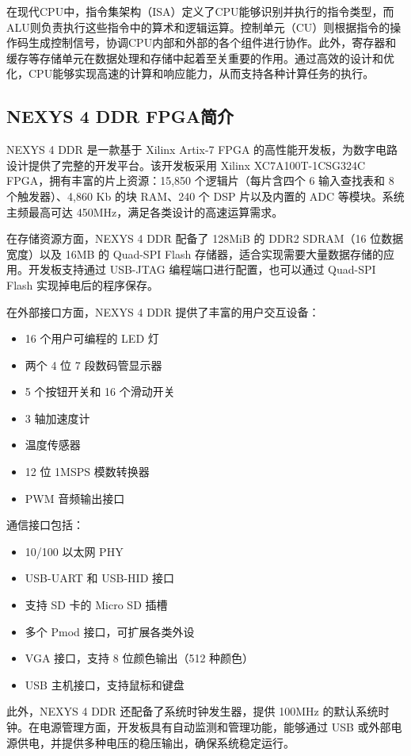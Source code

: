 \documentclass[lang=cn,a4paper,newtx]{elegantpaper}
\begin{document}
在现代CPU中，指令集架构（ISA）定义了CPU能够识别并执行的指令类型，而ALU则负责执行这些指令中的算术和逻辑运算。控制单元（CU）则根据指令的操作码生成控制信号，协调CPU内部和外部的各个组件进行协作。此外，寄存器和缓存等存储单元在数据处理和存储中起着至关重要的作用。通过高效的设计和优化，CPU能够实现高速的计算和响应能力，从而支持各种计算任务的执行。

\subsection{NEXYS 4 DDR FPGA简介}

NEXYS 4 DDR 是一款基于 Xilinx Artix-7 FPGA 的高性能开发板，为数字电路设计提供了完整的开发平台。该开发板采用 Xilinx XC7A100T-1CSG324C FPGA，拥有丰富的片上资源：15,850 个逻辑片（每片含四个 6 输入查找表和 8 个触发器）、4,860 Kb 的块 RAM、240 个 DSP 片以及内置的 ADC 等模块。系统主频最高可达 450MHz，满足各类设计的高速运算需求\cite{nexys4ddr}。

在存储资源方面，NEXYS 4 DDR 配备了 128MiB 的 DDR2 SDRAM（16 位数据宽度）以及 16MB 的 Quad-SPI Flash 存储器，适合实现需要大量数据存储的应用。开发板支持通过 USB-JTAG 编程端口进行配置，也可以通过 Quad-SPI Flash 实现掉电后的程序保存。

在外部接口方面，NEXYS 4 DDR 提供了丰富的用户交互设备：
\begin{itemize}
  \item 16 个用户可编程的 LED 灯
  \item 两个 4 位 7 段数码管显示器
  \item 5 个按钮开关和 16 个滑动开关
  \item 3 轴加速度计
  \item 温度传感器
  \item 12 位 1MSPS 模数转换器
  \item PWM 音频输出接口
\end{itemize}

通信接口包括：
\begin{itemize}
  \item 10/100 以太网 PHY
  \item USB-UART 和 USB-HID 接口
  \item 支持 SD 卡的 Micro SD 插槽
  \item 多个 Pmod 接口，可扩展各类外设
  \item VGA 接口，支持 8 位颜色输出（512 种颜色）
  \item USB 主机接口，支持鼠标和键盘
\end{itemize}


此外，NEXYS 4 DDR 还配备了系统时钟发生器，提供 100MHz 的默认系统时钟。在电源管理方面，开发板具有自动监测和管理功能，能够通过 USB 或外部电源供电，并提供多种电压的稳压输出，确保系统稳定运行。
\end{document}
